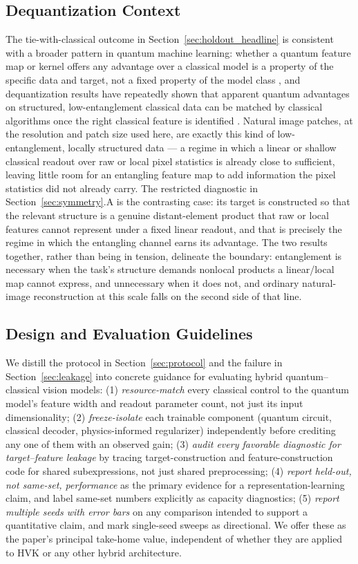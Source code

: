 \documentclass[journal]{IEEEtran}
\begin{document}
\subsection{Dequantization Context}
\label{sec:dequant}
The tie-with-classical outcome in Section~\ref{sec:holdout_headline} is consistent with a broader pattern in quantum machine learning: whether a quantum feature map or kernel offers any advantage over a classical model is a property of the specific data and target, not a fixed property of the model class \cite{Huang2021PowerData}, and dequantization results have repeatedly shown that apparent quantum advantages on structured, low-entanglement classical data can be matched by classical algorithms once the right classical feature is identified \cite{Havlicek2019}. Natural image patches, at the resolution and patch size used here, are exactly this kind of low-entanglement, locally structured data --- a regime in which a linear or shallow classical readout over raw or local pixel statistics is already close to sufficient, leaving little room for an entangling feature map to add information the pixel statistics did not already carry. The restricted diagnostic in Section~\ref{sec:symmetry}.A is the contrasting case: its target is constructed so that the relevant structure is a genuine distant-element product that raw or local features cannot represent under a fixed linear readout, and that is precisely the regime in which the entangling channel earns its advantage. The two results together, rather than being in tension, delineate the boundary: entanglement is necessary when the task's structure demands nonlocal products a linear/local map cannot express, and unnecessary when it does not, and ordinary natural-image reconstruction at this scale falls on the second side of that line.

\subsection{Design and Evaluation Guidelines}
We distill the protocol in Section~\ref{sec:protocol} and the failure in Section~\ref{sec:leakage} into concrete guidance for evaluating hybrid quantum--classical vision models: (1) \emph{resource-match} every classical control to the quantum model's feature width and readout parameter count, not just its input dimensionality; (2) \emph{freeze-isolate} each trainable component (quantum circuit, classical decoder, physics-informed regularizer) independently before crediting any one of them with an observed gain; (3) \emph{audit every favorable diagnostic for target--feature leakage} by tracing target-construction and feature-construction code for shared subexpressions, not just shared preprocessing; (4) \emph{report held-out, not same-set, performance} as the primary evidence for a representation-learning claim, and label same-set numbers explicitly as capacity diagnostics; (5) \emph{report multiple seeds with error bars} on any comparison intended to support a quantitative claim, and mark single-seed sweeps as directional. We offer these as the paper's principal take-home value, independent of whether they are applied to HVK or any other hybrid architecture.
\end{document}
